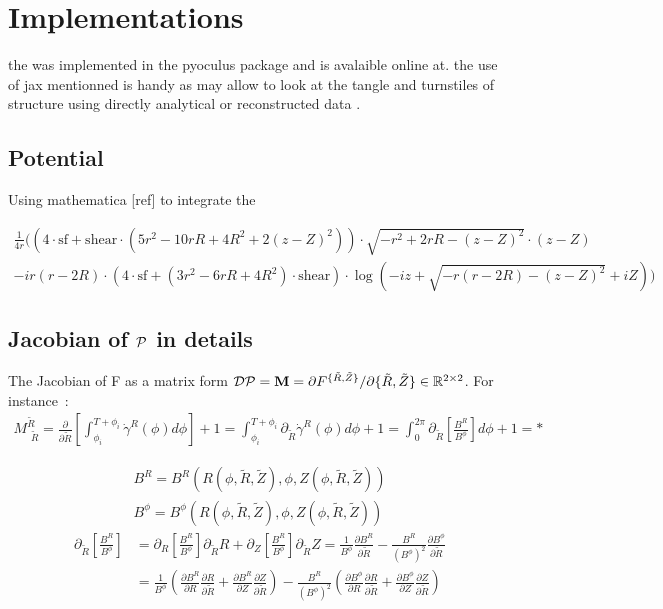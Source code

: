 \chapter{Implementations}

the was implemented in the pyoculus package and is avalaible online at. the use of jax mentionned is handy as may allow to look at the tangle and turnstiles of structure using directly analytical or reconstructed data .

\section{Potential}\label{sec:jaxpot}
Using mathematica [ref] to integrate the 

\begin{align*}
    \frac{1}{4r}( \left( 4 \cdot \text{sf} + \text{shear} \cdot \left( 5r^2 - 10rR + 4R^2 + 2(z - Z)^2 \right) \right) \cdot \sqrt{-r^2 + 2rR - (z - Z)^2} \cdot (z - Z)\\
    - i r(r - 2R) \cdot \left( 4 \cdot \text{sf} + \left( 3r^2 - 6rR + 4R^2 \right) \cdot \text{shear} \right) \cdot \log\left( -i z + \sqrt{-r(r - 2R) - (z - Z)^2} + i Z \right))
\end{align*}

\section{Jacobian of $\mathcal{P}$ in details}
The Jacobian of F as a matrix form $\mathcal{D}\mathcal{P} = \textbf{M} = \partial F^{\{\tilde{R},\tilde{Z}\}}/{\partial \{\tilde{R},\tilde{Z}\}} \in \mathbb{R}^{2\times2}$. For instance~:
\begin{align*}
    M^{\tilde{R}}_{\,\:\tilde{R}} = \frac{\partial}{\partial \tilde{R}}\left[\int_{\phi_i}^{T+\phi_i}\dot{\gamma}^R(\phi)d\phi\right] + 1 = \int_{\phi_i}^{T+\phi_i}\partial_{\tilde{R}}\dot{\gamma}^R(\phi)d\phi + 1 = \int_0^{2\pi}\partial_{\tilde{R}}\left[\frac{B^R}{B^\phi}\right]d\phi + 1 = *
\end{align*}

\begin{align*}
  B^R = B^R(R(\phi, \tilde{R}, \tilde{Z}), \phi, Z(\phi, \tilde{R}, \tilde{Z}))\\
    B^\phi = B^\phi(R(\phi, \tilde{R}, \tilde{Z}), \phi, Z(\phi, \tilde{R}, \tilde{Z}))
\end{align*}
\begin{align*}
    \partial_{\tilde{R}}\left[\frac{B^R}{B^\phi}\right] &= \partial_{R}\left[\frac{B^R}{B^\phi}\right]\partial_{\tilde{R}}R + \partial_{Z}\left[\frac{B^R}{B^\phi}\right]\partial_{\tilde{R}}Z = \frac{1}{B^\phi}\frac{\partial B^R}{\partial\tilde{R}} - \frac{B^R}{(B^\phi)^2}\frac{\partial B^\phi}{\partial\tilde{R}} \\&= \frac{1}{B^\phi}\left(\frac{\partial B^R}{\partial R}\frac{\partial R}{\partial\tilde{R}}+\frac{\partial B^R}{\partial Z}\frac{\partial Z}{\partial\tilde{R}}\right) - \frac{B^R}{(B^\phi)^2}\left(\frac{\partial B^\phi}{\partial R}\frac{\partial R}{\partial\tilde{R}}+\frac{\partial B^\phi}{\partial Z}\frac{\partial Z}{\partial\tilde{R}}\right)
\end{align*}

